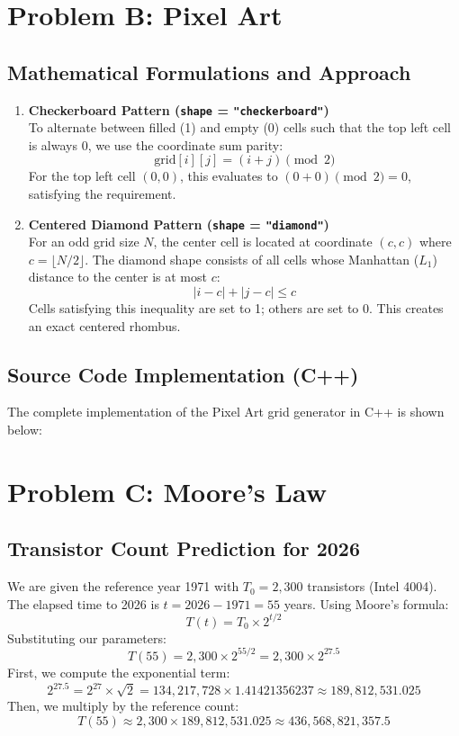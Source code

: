 \documentclass[11pt,a4paper]{article}
\begin{document}
\newpage

\section{Problem B: Pixel Art}

\subsection{Mathematical Formulations and Approach}
\begin{enumerate}
    \item \textbf{Checkerboard Pattern (\texttt{shape} = \texttt{"checkerboard"})} \\
    To alternate between filled (1) and empty (0) cells such that the top left cell is always 0, we use the coordinate sum parity:
    \[ \text{grid}[i][j] = (i + j) \pmod 2 \]
    For the top left cell $(0,0)$, this evaluates to $(0+0) \pmod 2 = 0$, satisfying the requirement.
    
    \item \textbf{Centered Diamond Pattern (\texttt{shape} = \texttt{"diamond"})} \\
    For an odd grid size $N$, the center cell is located at coordinate $(c, c)$ where $c = \lfloor N/2 \rfloor$. The diamond shape consists of all cells whose Manhattan ($L_1$) distance to the center is at most $c$:
    \[ |i - c| + |j - c| \le c \]
    Cells satisfying this inequality are set to 1; others are set to 0. This creates an exact centered rhombus.
\end{enumerate}

\subsection{Source Code Implementation (C++)}
The complete implementation of the Pixel Art grid generator in C++ is shown below:



\newpage

\section{Problem C: Moore's Law}

\subsection{Transistor Count Prediction for 2026}
We are given the reference year 1971 with $T_0 = 2,300$ transistors (Intel 4004). The elapsed time to 2026 is $t = 2026 - 1971 = 55$ years. 
Using Moore's formula:
\[ T(t) = T_0 \times 2^{t/2} \]
Substituting our parameters:
\[ T(55) = 2,300 \times 2^{55/2} = 2,300 \times 2^{27.5} \]
First, we compute the exponential term:
\[ 2^{27.5} = 2^{27} \times \sqrt{2} = 134,217,728 \times 1.41421356237 \approx 189,812,531.025 \]
Then, we multiply by the reference count:
\[ T(55) \approx 2,300 \times 189,812,531.025 \approx 436,568,821,357.5 \]
\end{document}

